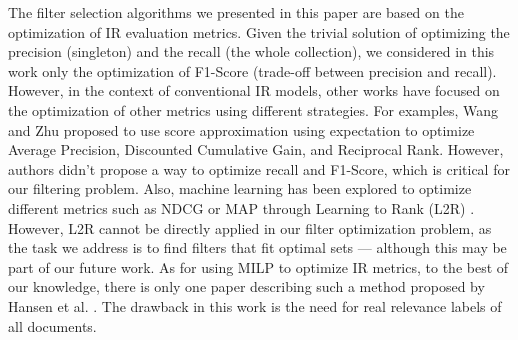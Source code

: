 
 The filter selection algorithms we presented in this paper are based on the optimization of IR evaluation metrics. Given the trivial solution of optimizing the precision (singleton) and the recall (the whole collection), we considered in this work only the optimization of F1-Score (trade-off between precision and recall). However, in the context of conventional IR models, other works have focused on the optimization of other metrics using different strategies. 
For examples, Wang and Zhu \cite{Wang2010} proposed  to use score approximation using expectation to optimize Average Precision, Discounted Cumulative Gain, and Reciprocal Rank. However, authors didn't propose a way to optimize recall and F1-Score, which is critical for our filtering problem.
Also, machine learning has been explored to optimize different metrics such as NDCG or MAP through Learning to Rank (L2R) \cite{Baeza-Yates2010}. 
However, L2R cannot be directly applied in our filter optimization problem, as the task we address is to find filters that fit optimal sets --- although this may be part of our future work. 
As for using MILP to optimize IR metrics, to the best of our knowledge, there is only one paper describing such a method proposed by Hansen et al. \cite{Hansen1991}. The drawback in this work is the need for real relevance labels of all documents.


